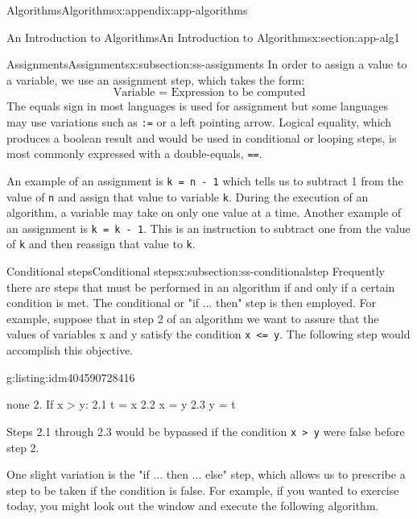 \documentclass[twoside,10pt,]{book}
\newcommand{\mono}[1]{\texttt{#1}}
\numberwithin{equation}{section}
\begin{document}
\begin{appendixptx}{Algorithms}{}{Algorithms}{}{}{x:appendix:app-algorithms}
\begin{sectionptx}{An Introduction to Algorithms}{}{An Introduction to Algorithms}{}{}{x:section:app-alg1}
\typeout{************************************************}
%
\begin{subsectionptx}{Assignments}{}{Assignments}{}{}{x:subsection:ss-assignments}
In order to assign a value to a variable, we use an assignment step, which takes the form:%
\begin{equation*}
\textrm{Variable = Expression to be computed}
\end{equation*}
The equals sign in most languages is used for assignment but some languages may use variations such as \mono{:=} or a left pointing arrow. Logical equality, which produces a boolean result and would be used in conditional or looping steps, is most commonly expressed with a double-equals, \mono{==}.%
\par
An example of an  assignment is \mono{k = n - 1} which tells us to subtract 1 from the value of \mono{n} and assign that value to variable \mono{k}. During the execution of an algorithm, a variable may take on only one value at a time. Another example of an assignment is \mono{k = k - 1}. This is an instruction to subtract one from the value of \mono{k} and then reassign that value to \mono{k}.%
\end{subsectionptx}
%
%
\typeout{************************************************}
\typeout{************************************************}
%
\begin{subsectionptx}{Conditional steps}{}{Conditional steps}{}{}{x:subsection:ss-conditionalstep}
Frequently there are steps that must be performed in an algorithm if and only if a certain condition is met. The conditional or "if ... then" step is then employed. For example, suppose that in step 2 of an algorithm we want to assure that the values of variables x and y satisfy the condition \mono{x <= y}. The following step would accomplish this objective.%
\begin{listingptx}{}{g:listing:idm404590728416}{}%
\begin{program}{none}
2. If x > y:
	2.1 t = x
	2.2 x = y
	2.3 y = t
\end{program}
\tcblower
\end{listingptx}%
Steps 2.1 through 2.3 would be bypassed if the condition \mono{x > y} were false before step 2.%
\par
One slight variation is the "if ... then ... else" step, which allows us to prescribe a step to be taken if the condition is false. For example, if you wanted to exercise today, you might look out the window and execute the following algorithm.%

\end{subsectionptx}
\end{sectionptx}
\end{appendixptx}
\end{document}
